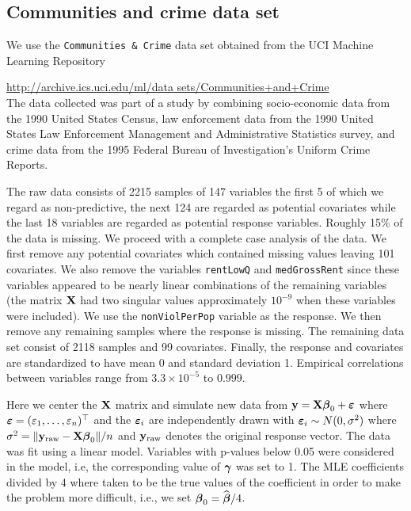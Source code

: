 
\subsection{Communities and crime data set}
\label{sec:crime}

We use the {\tt Communities \& Crime} data set obtained from the UCI Machine
Learning Repository   

\smallskip 

\noindent 
\url{http://archive.ics.uci.edu/ml/data sets/Communities+and+Crime}  \\

\noindent The data collected was part of a study by \cite{Redmond2002}
combining socio-economic data from the 1990 United States Census, law
enforcement data from the 1990 United States Law Enforcement Management and
Administrative Statistics survey, and crime data from the 1995 Federal Bureau
of Investigation's Uniform Crime Reports.

The raw data consists of 2215 samples of 147 variables the first 5 of which we
regard as non-predictive, the next 124 are regarded as potential covariates
while the last 18 variables are regarded as potential response variables.
Roughly 15\% of the data is missing. We proceed with a complete case analysis
of the data.  We first remove any potential covariates which contained missing
values leaving 101 covariates. We also remove the variables {\tt rentLowQ} and
{\tt medGrossRent} since these variables appeared to be nearly linear
combinations of the remaining variables (the matrix ${\bf X}$ had two singular
values approximately $10^{-9}$ when these variables were included).  We use the
{\tt nonViolPerPop} variable as the response. We then remove any remaining
samples where the response is missing. The remaining data set consist of 2118
samples and 99 covariates. Finally, the response and covariates are
standardized to have mean 0 and standard deviation 1. Empirical correlations
between variables range from $3.3\times10^{-5}$ to $0.999$.


Here we center the ${\bf X}$ matrix and simulate new data from ${\bf y}
= {\bf X}{\boldsymbol \beta}_0 + {\boldsymbol \varepsilon}$ where ${\boldsymbol \varepsilon} =
(\varepsilon_1,\ldots,\varepsilon_n)^\top$ and the ${\boldsymbol \varepsilon}_i$ are
independently drawn with ${\boldsymbol \varepsilon}_i \sim N(0,\sigma^2)$ where
$\sigma^2 = \|{\bf y}_{\mbox{\scriptsize raw}} - {\bf X}{\boldsymbol \beta}_0\|/n$
and ${\bf y}_{\mbox{\scriptsize raw}}$ denotes the original response vector.
The data was fit using a linear model.
Variables with p-values below 0.05 were considered in the model, i.e, the
corresponding value of ${\boldsymbol \gamma}$ was set to 1. The MLE coefficients divided
by 4 where taken to be the true values of the coefficient in order to make
the problem more difficult, i.e., we set ${\boldsymbol \beta}_0 = \widehat{{\boldsymbol \beta}}/4$.

